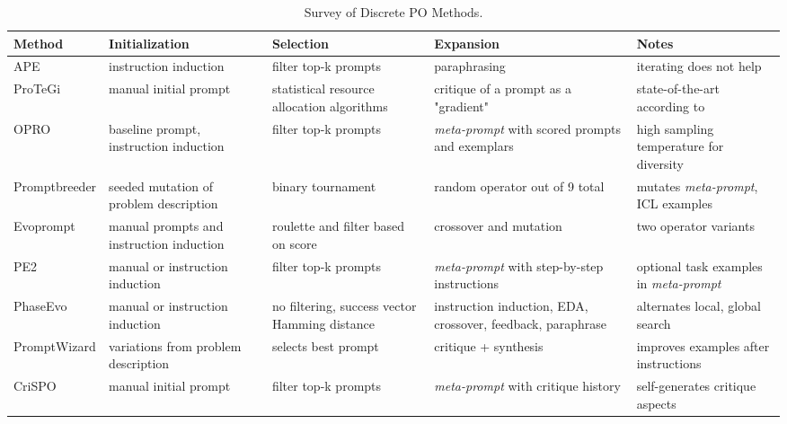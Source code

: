 \begin{landscape}
\begin{table}[htbp]
\centering
\caption{Survey of Discrete PO Methods.}\label{tab:optsurvey}
\begin{tabularx}{\linewidth}{@{}l Y Y Y Y@{}}
\toprule
\textbf{Method} & \textbf{Initialization} & \textbf{Selection} & \textbf{Expansion} & \textbf{Notes} \\
\midrule

APE\cite{zhou2023largelanguagemodelshumanlevel} & instruction induction & filter top-k prompts & paraphrasing & iterating does not help \\
ProTeGi\cite{pryzant2023automaticpromptoptimizationgradient} & manual initial prompt & statistical resource allocation algorithms & critique of a prompt as a "gradient" & state-of-the-art according to\cite{wan2024teachbettersmarterinstructions} \\
OPRO\cite{yang2024largelanguagemodelsoptimizers} & baseline prompt, instruction induction & filter top-k prompts & \textit{meta-prompt} with scored prompts and exemplars & high sampling temperature for diversity \\
Promptbreeder\cite{fernando2023promptbreederselfreferentialselfimprovementprompt} & seeded mutation of problem description & binary tournament & random operator out of 9 total & mutates \textit{meta-prompt}, ICL examples \\
Evoprompt\cite{guo2024connectinglargelanguagemodels} & manual prompts and instruction induction & roulette and filter based on score & crossover and mutation & two operator variants \\
PE2\cite{ye2024promptengineeringpromptengineer} & manual or instruction induction & filter top-k prompts & \textit{meta-prompt} with step-by-step instructions & optional task examples in \textit{meta-prompt} \\
PhaseEvo\cite{cui2024phaseevounifiedincontextprompt} & manual or instruction induction & no filtering, success vector Hamming distance & instruction induction, EDA, crossover, feedback, paraphrase & alternates local, global search \\
PromptWizard\cite{agarwal2024promptwizardtaskawarepromptoptimization} & variations from problem description & selects best prompt & critique + synthesis & improves examples after instructions \\
CriSPO\cite{he2024crispomultiaspectcritiquesuggestionguidedautomatic} & manual initial prompt & filter top-k prompts & \textit{meta-prompt} with critique history & self-generates critique aspects \\

\end{tabularx}
\end{table}
\end{landscape}
